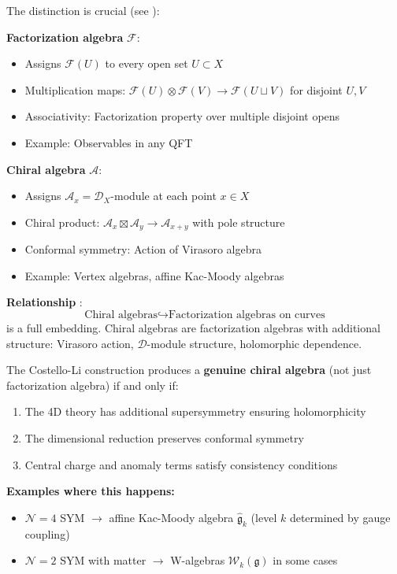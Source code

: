 \begin{remark}\label{rem:fact-vs-chiral}
The distinction is crucial (see ):

\textbf{Factorization algebra} $\mathcal{F}$:
\begin{itemize}
\item Assigns $\mathcal{F}(U)$ to every open set $U \subset X$
\item Multiplication maps: $\mathcal{F}(U) \otimes \mathcal{F}(V) \to \mathcal{F}(U \sqcup V)$ 
      for disjoint $U, V$
\item Associativity: Factorization property over multiple disjoint opens
\item Example: Observables in any QFT
\end{itemize}

\textbf{Chiral algebra} $\mathcal{A}$:
\begin{itemize}
\item Assigns $\mathcal{A}_x = \mathcal{D}_X$-module at each point $x \in X$
\item Chiral product: $\mathcal{A}_x \boxtimes \mathcal{A}_y \to \mathcal{A}_{x+y}$ 
      with pole structure
\item Conformal symmetry: Action of Virasoro algebra
\item Example: Vertex algebras, affine Kac-Moody algebras
\end{itemize}

\textbf{Relationship} \cite{BD04,CG17}:
$$\text{Chiral algebras} \hookrightarrow \text{Factorization algebras on curves}$$
is a full embedding. Chiral algebras are factorization algebras with additional 
structure: Virasoro action, $\mathcal{D}$-module structure, holomorphic dependence.
\end{remark}

\begin{proposition}\label{prop:CL-produces-chiral}
The Costello-Li construction produces a \textbf{genuine chiral algebra} (not just 
factorization algebra) if and only if:
\begin{enumerate}
\item The 4D theory has additional supersymmetry ensuring holomorphicity
\item The dimensional reduction preserves conformal symmetry
\item Central charge and anomaly terms satisfy consistency conditions
\end{enumerate}

\textbf{Examples where this happens:}
\begin{itemize}
\item $\mathcal{N}=4$ SYM $\to$ affine Kac-Moody algebra $\widehat{\mathfrak{g}}_k$ 
      (level $k$ determined by gauge coupling)
\item $\mathcal{N}=2$ SYM with matter $\to$ W-algebras $\mathcal{W}_k(\mathfrak{g})$ 
      in some cases
\end{itemize}
\end{proposition}


